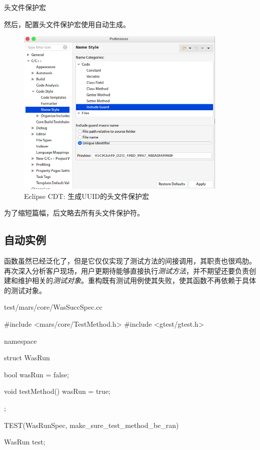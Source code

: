 \begin{content}
\begin{episode}{头文件保护宏}
\begin{content}
然后，配置头文件保护宏使用自动生成。

\begin{figure}[H]
\centering
\includegraphics[width=0.9\textwidth]{figures/xunit/eclipse-include-guard.png}
\caption{Eclipse CDT: 生成UUID的头文件保护宏}
 \label{fig:eclipse-include-guard}
\end{figure}

为了缩短篇幅，后文略去所有头文件保护符。

\end{content}
\end{episode}

\subsection{自动实例}

函数虽然已经泛化了，但是它仅仅实现了测试方法的间接调用，其职责也很鸡肋。再次深入分析客户现场，用户更期待能够直接执行\emph{测试方法}，并不期望还要负责创建和维护相关的\emph{测试对象}。重构既有测试用例使其失败，使其函数不再依赖于具体的测试对象。

\begin{diff}{test/mars/core/WasSuccSpec.cc}
\begin{minicpp}
#include <mars/core/TestMethod.h>
#include <gtest/gtest.h>

namespace {
  struct WasRun {
    bool wasRun = false;

    void testMethod() {
      wasRun = true;
    }
  };
}

TEST(WasRunSpec, make_sure_test_method_be_ran) {
  WasRun test;

}
\end{minicpp}
\end{diff}
\end{content}
